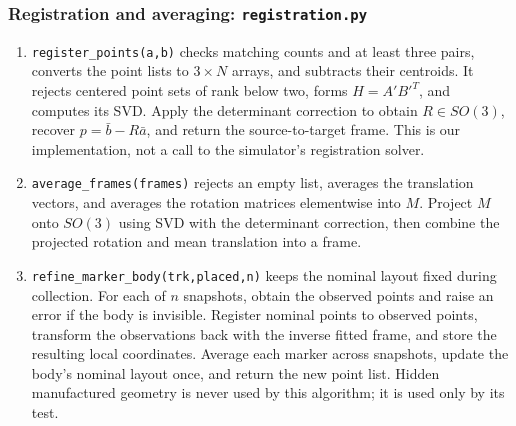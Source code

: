 \documentclass[11pt]{article}
\begin{document}
\subsubsection{Registration and averaging: \texttt{registration.py}}
\begin{enumerate}
\setlength{\itemsep}{0pt}
\item \texttt{register\_points(a,b)} checks matching counts and at least three pairs, converts the point lists to $3\times N$ arrays, and subtracts their centroids. It rejects centered point sets of rank below two, forms $H=A'B'^T$, and computes its SVD. Apply the determinant correction to obtain $R\in SO(3)$, recover $p=\bar b-R\bar a$, and return the source-to-target frame. This is our implementation, not a call to the simulator's registration solver.
\item \texttt{average\_frames(frames)} rejects an empty list, averages the translation vectors, and averages the rotation matrices elementwise into $M$. Project $M$ onto $SO(3)$ using SVD with the determinant correction, then combine the projected rotation and mean translation into a frame.
\item \texttt{refine\_marker\_body(trk,placed,n)} keeps the nominal layout fixed during collection. For each of $n$ snapshots, obtain the observed points and raise an error if the body is invisible. Register nominal points to observed points, transform the observations back with the inverse fitted frame, and store the resulting local coordinates. Average each marker across snapshots, update the body's nominal layout once, and return the new point list. Hidden manufactured geometry is never used by this algorithm; it is used only by its test.
\end{enumerate}
\end{document}
